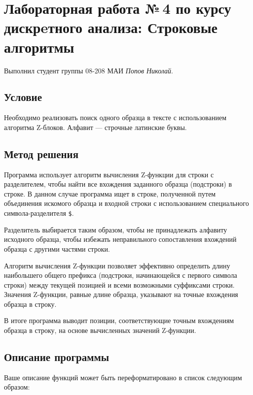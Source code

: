 \documentclass[12pt]{article}
\begin{document}
\section*{Лабораторная работа №\,4 по курсу дискрeтного анализа: Строковые алгоритмы}
Выполнил студент группы 08-208 МАИ \textit{Попов Николай}.

\subsection*{Условие}

Необходимо реализовать поиск одного образца в тексте с использованием алгоритма Z-блоков. Алфавит — строчные латинские буквы. 

\subsection*{Метод решения}

Программа использует алгоритм вычисления Z-функции для строки с разделителем, чтобы найти все вхождения заданного образца (подстроки) в строке. В данном случае программа ищет в строке, полученной путем объединения искомого образца и входной строки с использованием специального символа-разделителя \texttt{\$}.

Разделитель выбирается таким образом, чтобы не принадлежать алфавиту исходного образца, чтобы избежать неправильного сопоставления вхождений образца с другими частями строки.

Алгоритм вычисления Z-функции позволяет эффективно определить длину наибольшего общего префикса (подстроки, начинающейся с первого символа строки) между текущей позицией и всеми возможными суффиксами строки. Значения Z-функции, равные длине образца, указывают на точные вхождения образца в строку.

В итоге программа выводит позиции, соответствующие точным вхождениям образца в строку, на основе вычисленных значений Z-функции.

\subsection*{Описание программы}

Ваше описание функций может быть переформатировано в список следующим образом:
\end{document}
